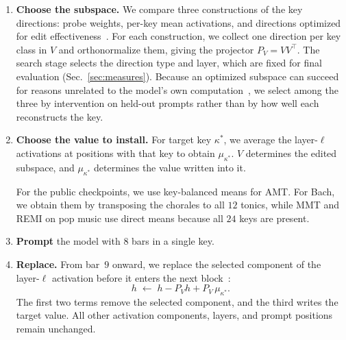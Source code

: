 \documentclass{article}
\begin{document}
\begin{enumerate}

\item \textbf{Choose the subspace.}
We compare three constructions of the key directions: probe weights, per-key mean activations, and directions optimized for edit effectiveness~\cite{geiger2024das}.
For each construction, we collect one direction per key class in $V$ and orthonormalize them, giving the projector $P_V{=}VV^{\!\top}$.
The search stage selects the direction type and layer, which are fixed for final evaluation (Sec.~\ref{sec:measures}).
Because an optimized subspace can succeed for reasons unrelated to the model's own computation~\cite{makelov2024illusion}, we select among the three by intervention on held-out prompts rather than by how well each reconstructs the key.

\item \textbf{Choose the value to install.}
For target key $\kappa^{*}$, we average the layer-$\ell$ activations at positions with that key to obtain $\mu_{\kappa^{*}}$.
$V$ determines the edited subspace, and $\mu_{\kappa^{*}}$ determines the value written into it.

For the public checkpoints, we use key-balanced means for AMT.
For Bach, we obtain them by transposing the chorales to all $12$ tonics, while MMT and REMI on pop music use direct means because all $24$ keys are present.

\item \textbf{Prompt} the model with $8$ bars in a single key.

\item \textbf{Replace.}
From bar~$9$ onward, we replace the selected component of the layer-$\ell$ activation before it enters the next block~\cite{geiger2021causal,meng2022rome}:
\begin{equation}
h \;\leftarrow\; h - P_V h + P_V\,\mu_{\kappa^{*}}.
\label{eq:edit}
\end{equation}
The first two terms remove the selected component, and the third writes the target value.
All other activation components, layers, and prompt positions remain unchanged.


\end{enumerate}
\end{document}
